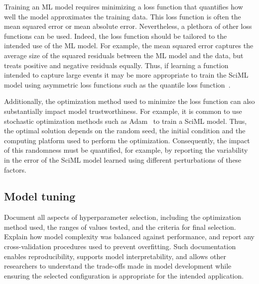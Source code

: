 Training an ML model requires minimizing a loss function that quantifies how well the model approximates the training data. This loss function is often the mean squared error or mean absolute error. Nevertheless, a plethora of other loss functions can be used. Indeed, the loss function should be tailored to the intended use of the ML model. For example, the mean squared error captures the average size of the squared residuals between the ML model and the data, but treats positive and negative residuals equally. Thus, if learning a function intended to capture large events it may be more appropriate to train the SciML model using asymmetric loss functions such as the quantile loss function~\cite{Jakeman_KH_RESS_2021}.

Additionally, the optimization method used to minimize the loss function can also substantially impact model trustworthiness. For example, it is common to use stochastic optimization methods such as Adam~\cite{Kingma_B_arxiv_2017} to train a SciML model. Thus, the optimal solution depends on the random seed, the initial condition and the computing platform used to perform the optimization. Consequently, the impact of this randomness must be quantified, for example, by reporting the variability in the error of the SciML model learned using different perturbations of these factors.

\subsection{Model tuning}

\begin{essrec}
Document all aspects of hyperparameter selection, including the optimization method used, the ranges of values tested, and the criteria for final selection. Explain how model complexity was balanced against performance, and report any cross-validation procedures used to prevent overfitting. Such documentation enables reproducibility, supports model interpretability, and allows other researchers to understand the trade-offs made in model development while ensuring the selected configuration is appropriate for the intended application.
\end{essrec}

